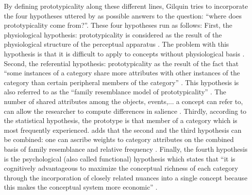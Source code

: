 By defining prototypicality along these different lines, Gilquin tries to incorporate the four hypotheses uttered by \citet{geeraerts_where_2006} as possible answers to the question: “where does prototypicality come from?”. These four hypotheses run as follows: First, the physiological hypothesis: prototypicality is considered as the result of the physiological structure of the perceptual apparatus \citep{moore_internal_1973}. The problem with this hypothesis is that it is difficult to apply to concepts without physiological basis \citet[28]{geeraerts_where_2006}. Second, the referential hypothesis: prototypicality as the result of the fact that “some instances of a category share more attributes with other instances of the category than certain peripheral members of the category” \citet[28]{geeraerts_where_2006}. This hypothesis is also referred to as the “family resemblance model of prototypicality” \citep{rosch_family_1975}. The number of shared attributes among the objects, events,... a concept can refer to, can allow the researcher to compute differences in salience \citep[29]{geeraerts_where_2006}. Thirdly, according to the statistical hypothesis, the prototype is that member of a category which is most frequently experienced. \citet[29]{geeraerts_where_2006} adds that the second and the third hypothesis can be combined: one can ascribe weights to category attributes on the combined basis of family resemblance and relative frequency \citep{rosch_cognitive_1975}. Finally, the fourth hypothesis is the psychological (also called functional) hypothesis which states that “it is cognitively advantageous to maximize the conceptual richness of each category through the incorporation of closely related nuances into a single concept because this makes the conceptual system more economic” \citep[28]{geeraerts_where_2006}.

